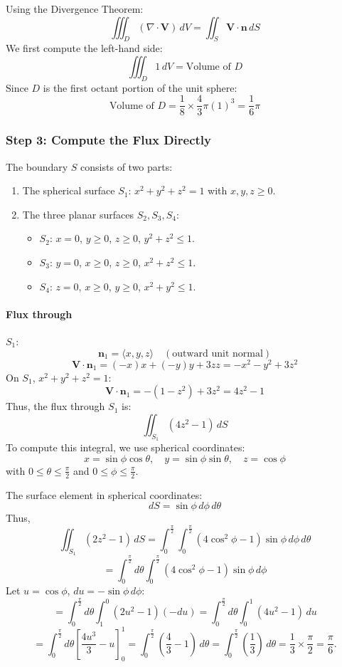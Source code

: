 \documentclass[11pt]{article}
\begin{document}
Using the Divergence Theorem:
\[
\iiint_{D} (\nabla \cdot \mathbf{V}) \, dV = \iint_{S} \mathbf{V} \cdot \mathbf{n} \, dS
\]
We first compute the left-hand side:
\[
\iiint_{D} 1 \, dV = \text{Volume of } D
\]
Since \( D \) is the first octant portion of the unit sphere:
\[
\text{Volume of } D = \frac{1}{8} \times \frac{4}{3}\pi (1)^3 = \frac{1}{6}\pi
\]

\subsubsection*{Step 3: Compute the Flux Directly}

The boundary \( S \) consists of two parts:
\begin{enumerate}
    \item The spherical surface \( S_1 \): \( x^2 + y^2 + z^2 = 1 \) with \( x, y, z \geq 0 \).
    \item The three planar surfaces \( S_2, S_3, S_4 \):
    \begin{itemize}
        \item \( S_2 \): \( x = 0 \), \( y \geq 0 \), \( z \geq 0 \), \( y^2 + z^2 \leq 1 \).
        \item \( S_3 \): \( y = 0 \), \( x \geq 0 \), \( z \geq 0 \), \( x^2 + z^2 \leq 1 \).
        \item \( S_4 \): \( z = 0 \), \( x \geq 0 \), \( y \geq 0 \), \( x^2 + y^2 \leq 1 \).
    \end{itemize}
\end{enumerate}

\paragraph{Flux through } $S_1$:
\[
\mathbf{n}_1 = \langle x, y, z \rangle \quad (\text{outward unit normal})
\]
\[
\mathbf{V} \cdot \mathbf{n}_1 = (-x)x + (-y)y + 3z z = -x^2 - y^2 + 3z^2
\]
On \( S_1 \), \( x^2 + y^2 + z^2 = 1 \):
\[
\mathbf{V} \cdot \mathbf{n}_1 = - (1 - z^2) + 3z^2 = 4z^2 - 1
\]
Thus, the flux through \( S_1 \) is:
\[
\iint_{S_1} (4z^2 - 1) \, dS
\]
To compute this integral, we use spherical coordinates:
\[
x = \sin\phi \cos\theta, \quad y = \sin\phi \sin\theta, \quad z = \cos\phi
\]
with \( 0 \leq \theta \leq \frac{\pi}{2} \) and \( 0 \leq \phi \leq \frac{\pi}{2} \).

The surface element in spherical coordinates:
\[
dS = \sin\phi \, d\phi \, d\theta
\]
Thus,
\[
\iint_{S_1} (2z^2 - 1) \, dS = \int_{0}^{\frac{\pi}{2}} \int_{0}^{\frac{\pi}{2}} \left( 4\cos^2\phi - 1 \right) \sin\phi \, d\phi \, d\theta
\]
\[
= \int_{0}^{\frac{\pi}{2}} d\theta \int_{0}^{\frac{\pi}{2}} (4\cos^2\phi - 1) \sin\phi \, d\phi
\]
Let \( u = \cos\phi \), \( du = -\sin\phi \, d\phi \):
\[
= \int_{0}^{\frac{\pi}{2}} d\theta \int_{1}^{0} (2u^2 - 1)(-du) = \int_{0}^{\frac{\pi}{2}} d\theta \int_{0}^{1} (4u^2 - 1) \, du
\]
\[
= \int_{0}^{\frac{\pi}{2}} d\theta \left[ \frac{4u^3}{3} - u \right]_{0}^{1} = \int_{0}^{\frac{\pi}{2}} \left( \frac{4}{3} - 1 \right) \, d\theta = \int_{0}^{\frac{\pi}{2}} \left( \frac{1}{3} \right) \, d\theta = \frac{1}{3} \times \frac{\pi}{2} = \frac{\pi}{6}.
\]
\end{document}
